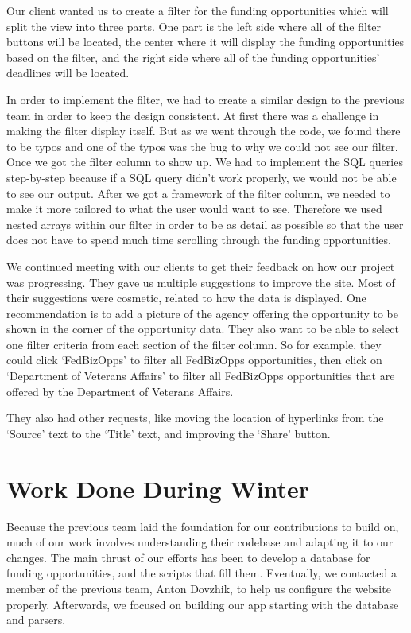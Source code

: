\documentclass[onecolumn]{IEEEtran}
\begin{document}
Our client wanted us to create a filter for the funding opportunities which will split the view into three parts. One part is the left side where all of the filter buttons will be located, the center where it will display the funding opportunities based on the filter, and the right side where all of the funding opportunities' deadlines will be located. 

In order to implement the filter, we had to create a similar design to the previous team in order to keep the design consistent. At first there was a challenge in making the filter display itself. But as we went through the code, we found there to be typos and one of the typos was the bug to why we could not see our filter. Once we got the filter column to show up. We had to implement the SQL queries step-by-step because if a SQL query didn't work properly, we would not be able to see our output. After we got a framework of the filter column, we needed to make it more tailored to what the user would want to see. Therefore we used nested arrays within our filter in order to be as detail as possible so that the user does not have to spend much time scrolling through the funding opportunities.

We continued meeting with our clients to get their feedback on how our project was progressing. They gave us multiple suggestions to improve the site. Most of their suggestions were cosmetic, related to how the data is displayed. One recommendation is to add a picture of the agency offering the opportunity to be shown in the corner of the opportunity data. They also want to be able to select one filter criteria from each section of the filter column. So for example, they could click `FedBizOpps' to filter all FedBizOpps opportunities, then click on `Department of Veterans Affairs' to filter all FedBizOpps opportunities that are offered by the Department of Veterans Affairs.

They also had other requests, like moving the location of hyperlinks from the `Source' text to the `Title' text, and improving the `Share' button.


\section{Work Done During Winter}
Because the previous team laid the foundation for our contributions to build on, much of our work involves understanding their codebase and adapting it to our changes. The main thrust of our efforts has been to develop a database for funding opportunities, and the scripts that fill them. Eventually, we contacted a member of the previous team, Anton Dovzhik, to help us configure the website properly. Afterwards, we focused on building our app starting with the database and parsers.
\end{document}
